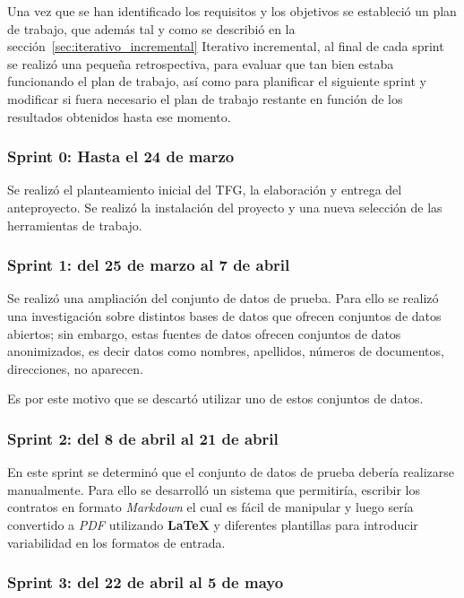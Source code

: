 Una vez que se han identificado los requisitos y los objetivos se estableció un plan de trabajo, que además tal y como
se describió en la sección~\ref{sec:iterativo_incremental} Iterativo incremental, al final de cada sprint se realizó
una pequeña retrospectiva, para evaluar que tan bien estaba funcionando el plan de trabajo, así como para planificar
el siguiente sprint y modificar si fuera necesario el plan de trabajo restante en función de los resultados obtenidos
hasta ese momento.

\subsubsection{Sprint 0: Hasta el 24 de marzo}

Se realizó el planteamiento inicial del TFG, la elaboración y entrega del anteproyecto.
Se realizó la instalación del proyecto y una nueva selección de las herramientas de trabajo.

\subsubsection{Sprint 1: del 25 de marzo al 7 de abril}

Se realizó una ampliación del conjunto de datos de prueba.
Para ello se realizó una investigación sobre distintos bases de datos que ofrecen conjuntos de datos abiertos; sin
embargo, estas fuentes de datos ofrecen conjuntos de datos anonimizados, es decir datos como nombres, apellidos,
números de documentos, direcciones, no aparecen.

Es por este motivo que se descartó utilizar uno de estos conjuntos de datos.

\subsubsection{Sprint 2: del 8 de abril al 21 de abril}

En este sprint se determinó que el conjunto de datos de prueba debería realizarse manualmente.
Para ello se desarrolló un sistema que permitiría, escribir los contratos en formato \textit{Markdown} el cual es fácil
de manipular y luego sería convertido a \textit{PDF} utilizando \textbf{LaTeX} y diferentes plantillas para introducir
variabilidad en los formatos de entrada.

\subsubsection{Sprint 3: del 22 de abril al 5 de mayo}

